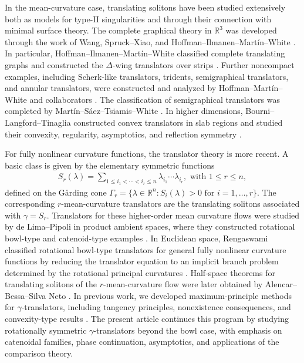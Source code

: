 \documentclass{amsart}
\theoremstyle{plain}
\theoremstyle{mainintrothm}
\theoremstyle{definition}
\begin{document}
In the mean-curvature case, translating solitons have been studied extensively
both as models for type-II singularities and through their connection with
minimal surface theory.  The complete graphical theory in $\mathbb R^3$ was
developed through the work of Wang, Spruck--Xiao, and
Hoffman--Ilmanen--Mart\'in--White
\cite{wang2011convex,spruck-xiao,hoffman2019graphical,HIMW-notes}.  In
particular, Hoffman--Ilmanen--Mart\'in--White classified complete translating
graphs and constructed the $\Delta$-wing translators over strips
\cite{hoffman2019graphical,HIMW-notes}.  Further noncompact examples, including
Scherk-like translators, tridents, semigraphical translators, and annular
translators, were constructed and analyzed by Hoffman--Mart\'in--White and
collaborators
\cite{HMW-scherk,HMWS-tridents,HMW-translating-annuli,HMWS-deltawings}.  The
classification of semigraphical translators was completed by
Mart\'in--S\'aez--Tsiamis--White \cite{martin2024classification}.  In higher
dimensions, Bourni--Langford--Tinaglia constructed convex translators in slab
regions and studied their convexity, regularity, asymptotics, and reflection
symmetry \cite{bourni2020existence}.

\medskip

For fully nonlinear curvature functions, the translator theory is more recent.
A basic class is given by the elementary symmetric functions
\begin{align*}
	S_r(\lambda)
	=
	\sum_{1\leq i_1<\cdots<i_r\leq n}
	\lambda_{i_1}\cdots\lambda_{i_r},
	\mbox{ with }
	1\leq r\leq n,
\end{align*}
defined on the G{\aa}rding cone $\Gamma_r=\{\lambda\in\mathbb R^n:S_i(\lambda)>0\text{ for }i=1,\ldots,r\}$. The corresponding $r$-mean-curvature translators are the translating solitons
associated with $\gamma=S_r$.  Translators for these higher-order mean curvature
flows were studied by de Lima--Pipoli in product ambient spaces, where they
constructed rotational bowl-type and catenoid-type examples
\cite{lima2025translators}.  In Euclidean space, Rengaswami classified
rotational bowl-type translators for general fully nonlinear curvature functions
by reducing the translator equation to an implicit branch problem determined by
the rotational principal curvatures \cite{rengaswami2024classification}.
Half-space theorems for translating solitons of the $r$-mean-curvature flow
were later obtained by Alencar--Bessa--Silva Neto
\cite{alencar2026halfspace}.  In previous work, we developed
maximum-principle methods for $\gamma$-translators, including tangency
principles, nonexistence consequences, and convexity-type results
\cite{Yo,Yo2}.  The present article continues this program by studying
rotationally symmetric $\gamma$-translators beyond the bowl case, with emphasis
on catenoidal families, phase continuation, asymptotics, and applications of the
comparison theory.
\end{document}
